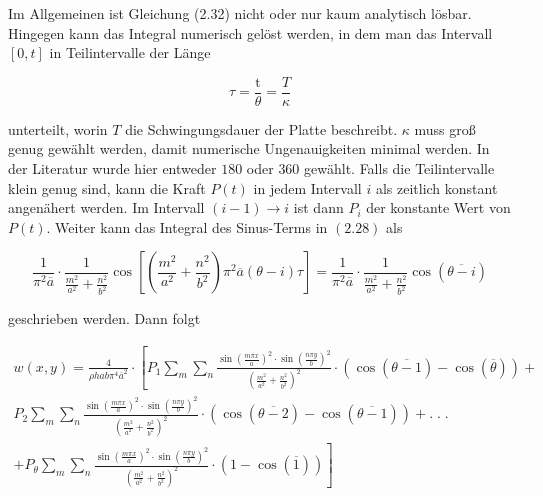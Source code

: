 Im Allgemeinen ist Gleichung (2.32) nicht oder nur kaum analytisch lösbar. Hingegen kann das Integral numerisch gelöst werden, in dem man das Intervall $\left[ 0,t \right]$ in Teilintervalle der Länge

 \begin{equation}
 	\tau = \dfrac{\mbox{t}}{\theta}=\dfrac{T}{\kappa}
 \end{equation}
 
 unterteilt, worin $T$ die Schwingungsdauer der Platte beschreibt. $\kappa$ muss groß genug gewählt werden, damit numerische Ungenauigkeiten minimal werden. In der Literatur wurde hier entweder $180$ oder $360$ gewählt. Falls die Teilintervalle klein genug sind, kann die Kraft $P(t)$ in jedem Intervall $i$ als zeitlich konstant angenähert werden. Im Intervall $(i-1) \rightarrow i$ ist dann $P_{i}$ der konstante Wert von $P(t)$. Weiter kann das Integral des Sinus-Terms in $(2.28)$ als
 
 \begin{equation}
 	\frac{1}{\pi^2\overline{a}} \cdot \frac{1}{\frac{m^2}{a^2}+\frac{n^2}{b^2}} \cos \left[ \left( \frac{m^2}{a^2}+\frac{n^2}{b^2} \right) \pi^2\overline{a}(\theta - i)\tau\right]= \frac{1}{\pi^2\overline{a}} \cdot \frac{1}{\frac{m^2}{a^2}+\frac{n^2}{b^2}} \cos(\overline{\theta-i})
 \end{equation}  

geschrieben werden. Dann folgt

\begin{equation}
\begin{multlined}
	w(x,y) = \frac{4}{\rho h a b \pi^4 \overline{a}^2} \cdot \left[ P_{1} \sum_m \sum_n \frac{\sin \left( \frac{m \pi x}{a} \right)^2 \cdot \sin \left( \frac{n \pi y}{b} \right)^2}{ \left( \frac{m^2}{a^2} + \frac{n^2}{b^2} \right)^2} \cdot \left( \cos(\overline{\theta-1}) - \cos(\overline{\theta}) \right) + \right. \\ P_{2} \sum_m \sum_n \frac{\sin \left( \frac{m \pi x}{a} \right)^2 \cdot \sin \left( \frac{n \pi y}{b} \right)^2}{ \left( \frac{m^2}{a^2} + \frac{n^2}{b^2} \right)^2} \cdot \left( \cos(\overline{\theta-2}) - \cos(\overline{\theta-1}) \right) + . \; . \; .\ \\ \left. + P_{\theta} \sum_m \sum_n \frac{\sin \left( \frac{m \pi x}{a} \right)^2 \cdot \sin \left( \frac{n \pi y}{b} \right)^2}{ \left( \frac{m^2}{a^2} + \frac{n^2}{b^2} \right)^2} \cdot \left( 1 - \cos(\overline{1}) \right) \right]
\end{multlined}
\end{equation}

